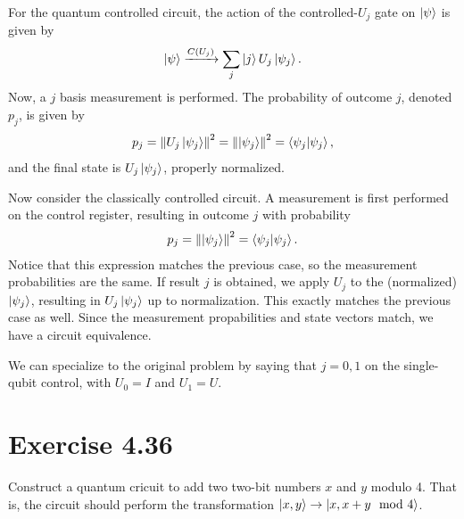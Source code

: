 \documentclass{book}
\begin{document}
    For the quantum controlled circuit, the action of the controlled-$U_j$ gate on $\ket{\psi}$ is given by
    \begin{align}
        \ket{\psi} \xrightarrow{C(U_j)} \sum_j \ket{j} U_j \ket{\psi_j}. 
    \end{align}
    Now, a $j$ basis measurement is performed. The probability of outcome $j$, denoted $p_j$, is given by
    \begin{align}
        p_j = \norm{U_j \ket{\psi_j}}^2 = \norm{\ket{\psi_j}}^2 = \bra{\psi_j}\ket{\psi_j},
    \end{align}
    and the final state is $U_j \ket{\psi_j}$, properly normalized. 

    Now consider the classically controlled circuit. A measurement is first performed on the control register, resulting in outcome $j$ with probability
    \begin{align}
        p_j = \norm{\ket{\psi_j}}^2 = \bra{\psi_j}\ket{\psi_j}.
    \end{align}
    Notice that this expression matches the previous case, so the measurement probabilities are the same. If result $j$ is obtained, we apply $U_j$ to the (normalized) $\ket{\psi_j}$, resulting in $U_j \ket{\psi_j}$ up to normalization. This exactly matches the previous case as well. Since the measurement propabilities and state vectors match, we have a circuit equivalence.

    We can specialize to the original problem by saying that $j = 0,1$ on the single-qubit control, with $U_0 = I$ and $U_1 = U$. 

\section*{Exercise 4.36}
    Construct a quantum cricuit to add two two-bit numbers $x$ and $y$ modulo 4. That is, the circuit should perform the transformation $\ket{x,y} \rightarrow \ket{x, x+ y \mod{4}}$.
\end{document}
